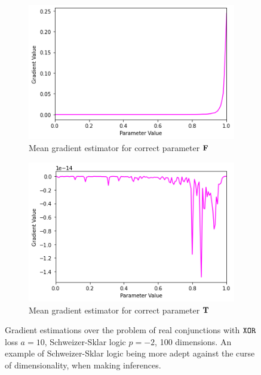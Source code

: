 \begin{figure}[h]
\begin{subfigure}[b]{0.47\textwidth}
        \includegraphics[width=\textwidth]{imgs/grad_ss_10_falseparam_100dim_avg.png}
        \caption{Mean gradient estimator for correct parameter $\textbf{F}$}
        \label{fig:conjgrad10falseavgss100}
    \end{subfigure}
    \begin{subfigure}[b]{0.47\textwidth}
        \centering
        \includegraphics[width=\textwidth]{imgs/grad_ss_10_trueparam_100dim_avg.png}
        \caption{Mean gradient estimator for correct parameter $\textbf{T}$}
        \label{fig:conjgrad10trueavgss100}
    \end{subfigure}
       \caption{Gradient estimations over the problem of real conjunctions with $\texttt{XOR}$ loss $a=10$, Schweizer-Sklar logic $p=-2$, 100 dimensions. An example of Schweizer-Sklar logic being more adept against the curse of dimensionality, when making inferences.}
       \label{fig:conjgrad10ss100}
\end{figure}


